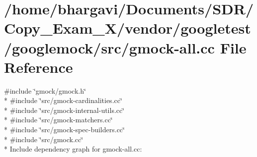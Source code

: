 \hypertarget{gmock-all_8cc}{}\section{/home/bhargavi/\+Documents/\+S\+D\+R/\+Copy\+\_\+\+Exam\+\_\+X/vendor/googletest/googlemock/src/gmock-\/all.cc File Reference}
\label{gmock-all_8cc}
{\ttfamily \#include \char`\"{}gmock/gmock.\+h\char`\"{}}\\*
{\ttfamily \#include \char`\"{}src/gmock-\/cardinalities.\+cc\char`\"{}}\\*
{\ttfamily \#include \char`\"{}src/gmock-\/internal-\/utils.\+cc\char`\"{}}\\*
{\ttfamily \#include \char`\"{}src/gmock-\/matchers.\+cc\char`\"{}}\\*
{\ttfamily \#include \char`\"{}src/gmock-\/spec-\/builders.\+cc\char`\"{}}\\*
{\ttfamily \#include \char`\"{}src/gmock.\+cc\char`\"{}}\\*
Include dependency graph for gmock-\/all.cc\+:
